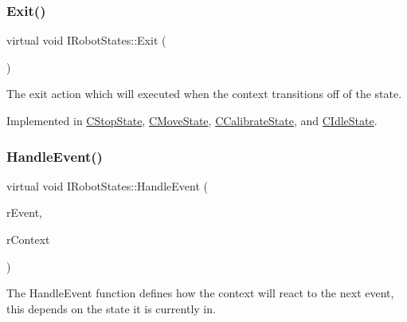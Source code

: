 \mbox{\label{classIRobotStates_a099417875e67f047ca38e08890491529}} 
\subsubsection{\texorpdfstring{Exit()}{Exit()}}
{\footnotesize\ttfamily virtual void I\+Robot\+States\+::\+Exit (\begin{DoxyParamCaption}{ }\end{DoxyParamCaption})\hspace{0.3cm}{\ttfamily [pure virtual]}}



The exit action which will executed when the context transitions off of the state. 



Implemented in \hyperlink{classCStopState_a2bf7d1e44a9b0c689c86fb00f9684a7b}{C\+Stop\+State}, \hyperlink{classCMoveState_ac6f27ce9a561ab6baf297e106d3f346d}{C\+Move\+State}, \hyperlink{classCCalibrateState_a0bdb13da2af72f1e8e814a365f8d765a}{C\+Calibrate\+State}, and \hyperlink{classCIdleState_a634bf12d9a7f29504c7dc6df7d419835}{C\+Idle\+State}.

\mbox{\label{classIRobotStates_a0b6c28a3deed04f93371a9395022f1ed}} 
\subsubsection{\texorpdfstring{Handle\+Event()}{HandleEvent()}}
{\footnotesize\ttfamily virtual void I\+Robot\+States\+::\+Handle\+Event (\begin{DoxyParamCaption}\item[{\hyperlink{classCEvent}{C\+Event} \&}]{r\+Event,  }\item[{\hyperlink{classCRobotContext}{C\+Robot\+Context} \&}]{r\+Context }\end{DoxyParamCaption})\hspace{0.3cm}{\ttfamily [pure virtual]}}



The Handle\+Event function defines how the context will react to the next event, this depends on the state it is currently in. 


